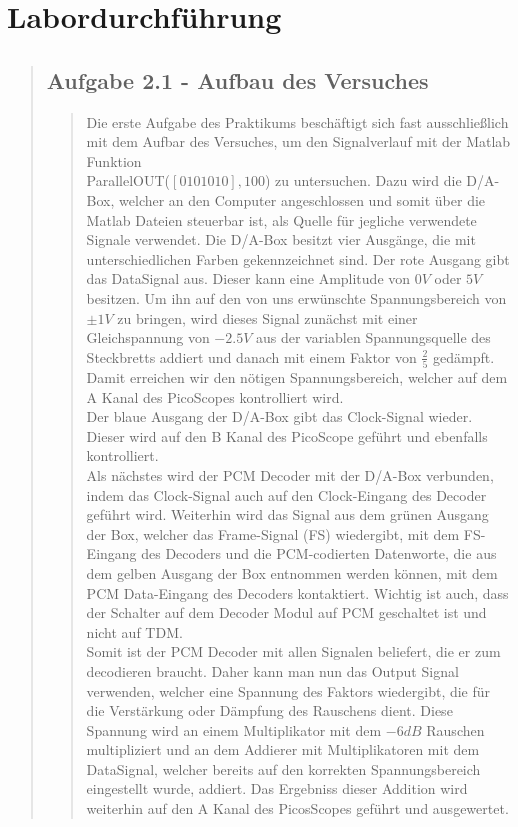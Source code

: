 \section{Labordurchführung}
\begin{quote}
    
    \subsection{Aufgabe 2.1 - Aufbau des Versuches}
    \begin{quote}
        
        Die erste Aufgabe des Praktikums beschäftigt sich fast ausschließlich
        mit dem Aufbar des Versuches, um den Signalverlauf mit der Matlab
        Funktion\\ 
        ParallelOUT($[0 1 0 1 0 1 0],100$) zu untersuchen. Dazu wird
        die D/A-Box, welcher an den Computer angeschlossen und somit über
        die Matlab Dateien steuerbar ist, als Quelle für jegliche verwendete
        Signale verwendet. Die D/A-Box besitzt vier Ausgänge, die mit
        unterschiedlichen Farben gekennzeichnet sind. Der rote Ausgang gibt das
        DataSignal aus. Dieser kann eine Amplitude von $0V$ oder $5V$ besitzen.
        Um ihn auf den von uns erwünschte Spannungsbereich von $\pm 1V$ zu
        bringen, wird dieses Signal zunächst mit einer Gleichspannung von
        $-2.5V$ aus der variablen Spannungsquelle des Steckbretts addiert und
        danach mit einem Faktor von $\frac{2}{5}$ gedämpft. Damit erreichen wir
        den nötigen Spannungsbereich, welcher auf dem A Kanal des PicoScopes
        kontrolliert wird.\\
        Der blaue Ausgang der D/A-Box gibt das Clock-Signal wieder. Dieser wird
        auf den B Kanal des PicoScope geführt und ebenfalls kontrolliert.\\
        Als nächstes wird der PCM Decoder mit der D/A-Box verbunden, indem das
        Clock-Signal auch auf den Clock-Eingang des Decoder geführt wird.
        Weiterhin wird das Signal aus dem grünen Ausgang der Box, welcher das
        Frame-Signal (FS) wiedergibt, mit dem FS-Eingang des Decoders
        und die PCM-codierten Datenworte, die aus dem gelben Ausgang der Box
        entnommen werden können, mit dem PCM Data-Eingang des Decoders
        kontaktiert. Wichtig ist auch, dass der Schalter auf dem Decoder Modul
        auf PCM geschaltet ist und nicht auf TDM.\\
        Somit ist der PCM Decoder mit allen Signalen beliefert, die er zum
        decodieren braucht. Daher kann man nun das Output Signal verwenden,
        welcher eine Spannung des Faktors wiedergibt, die für die
        Verstärkung oder Dämpfung des Rauschens dient. Diese Spannung wird an
        einem Multiplikator mit dem $-6 dB$ Rauschen multipliziert und an dem
        Addierer mit Multiplikatoren mit dem DataSignal, welcher bereits auf den korrekten Spannungsbereich
        eingestellt wurde, addiert. Das Ergebniss dieser Addition wird weiterhin
        auf den A Kanal des PicosScopes geführt und ausgewertet.\\
        

\end{quote}
\end{quote}
